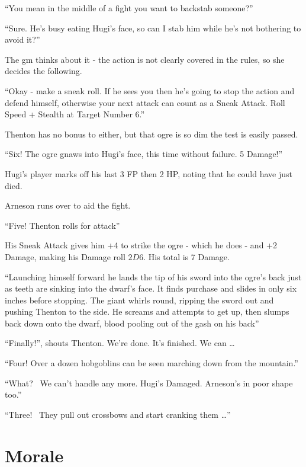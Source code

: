 \documentclass[titlepage,a4paper,openany]{book}
\begin{document}
\begin{multicols}{2}
{\begin{exampletext}
		``You mean in the middle of a fight you want to backstab someone?''

		``Sure. He's busy eating Hugi's face, so can I stab him while he's not bothering to avoid it?''

		The \gls{gm} thinks about it - the action is not clearly covered in the rules, so she decides the following.

		``Okay - make a sneak roll. If he sees you then he's going to stop the action and defend himself, otherwise your next attack can count as a Sneak Attack. Roll Speed + Stealth at Target Number 6.''

		Thenton has no bonus to either, but that ogre is so dim the test is easily passed. 

		``Six! The ogre gnaws into Hugi's face, this time without failure. 5 Damage!''

		Hugi's player marks off his last 3 FP then 2 HP, noting that he could have just died.

		Arneson runs over to aid the fight.

``Five! Thenton rolls for attack''

His Sneak Attack gives him +4 to strike the ogre - which he does - and +2 Damage, making his Damage roll $2D6$. His total is 7 Damage.

		``Launching himself forward he lands the tip of his sword into the ogre's back just as teeth are sinking into the dwarf's face. It finds purchase and slides in only six inches before stopping. The giant whirls \gls{round}, ripping the sword out and pushing Thenton to the side. He screams and attempts to get up, then slumps back down onto the dwarf, blood pooling out of the gash on his back''

``Finally!'', shouts Thenton. We're done. It's finished. We can {\dots}

``Four! Over a dozen hobgoblins can be seen marching down from the mountain.''

``What? \ We can't handle any more. Hugi's Damaged. Arneson's in poor shape too.''

``Three! \ They pull out crossbows and start cranking them {\dots}''
	\end{exampletext}}{}

\end{multicols}

\section{Morale}
\end{document}
